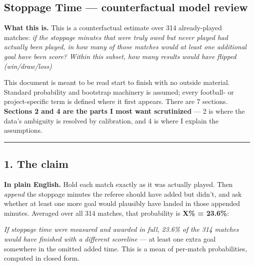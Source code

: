 \documentclass[
]{article}
\author{}
\date{\vspace{-2.5em}}
\begin{document}
\subsection{Stoppage Time --- counterfactual model
review}\label{stoppage-time-counterfactual-model-review}

\textbf{What this is.} This is a counterfactual estimate over 314
already-played matches: \emph{if the stoppage minutes that were truly
owed but never played had actually been played, in how many of those
matches would at least one additional goal have been score? Within this
subset, how many results would have flipped (win/draw/loss)}

This document is meant to be read start to finish with no outside
material. Standard probability and bootstrap machinery is assumed; every
football- or project-specific term is defined where it first appears.
There are 7 sections. \textbf{Sections 2 and 4 are the parts I most want
scrutinized} --- 2 is where the data's ambiguity is resolved by
calibration, and 4 is where I explain the assumptions.

\begin{center}\rule{0.5\linewidth}{0.5pt}\end{center}

\subsection{1. The claim}\label{the-claim}

\textbf{In plain English.} Hold each match exactly as it was actually
played. Then \emph{append} the stoppage minutes the referee should have
added but didn't, and ask whether at least one more goal would plausibly
have landed in those appended minutes. Averaged over all 314 matches,
that probability is \textbf{X\% = 23.6\%}:

\emph{If stoppage time were measured and awarded in full, 23.6\% of the
314 matches would have finished with a different scoreline} --- at least
one extra goal somewhere in the omitted added time. This is a mean of
per-match probabilities, computed in closed form.
\end{document}
